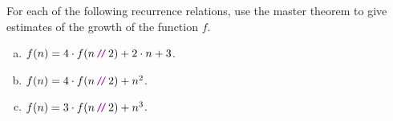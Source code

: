 \exercise
For each of the following recurrence relations, use the master theorem to give estimates of the
growth of the function $f$. 
\begin{enumerate}[(a)]
\item $f(n) = 4 \cdot f(n \dv 2) + 2 \cdot n + 3$.
\item $f(n) = 4 \cdot f(n \dv 2) + n^2$.
\item $f(n) = 3 \cdot f(n \dv 2) + n^3$.  \eox
\end{enumerate}



